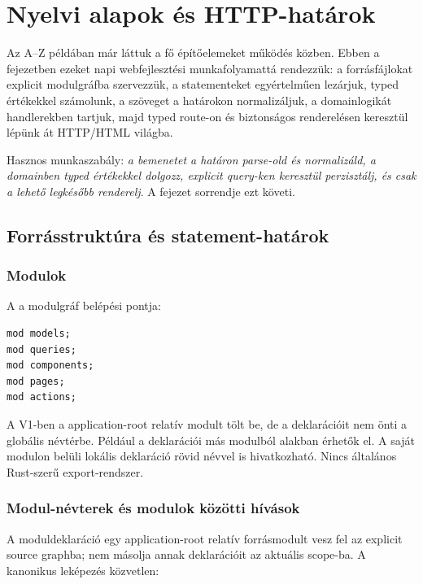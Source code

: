 \chapter{Nyelvi alapok és HTTP-határok}

Az A--Z példában már láttuk a fő építőelemeket működés közben. Ebben a fejezetben ezeket napi webfejlesztési munkafolyamattá rendezzük: a forrásfájlokat explicit modulgráfba szervezzük, a statementeket egyértelműen lezárjuk, typed értékekkel számolunk, a szöveget a határokon normalizáljuk, a domainlogikát handlerekben tartjuk, majd typed route-on és biztonságos renderelésen keresztül lépünk át HTTP/HTML világba.

Hasznos munkaszabály: \emph{a bemenetet a határon parse-old és normalizáld, a domainben typed értékekkel dolgozz, explicit query-ken keresztül perzisztálj, és csak a lehető legkésőbb renderelj}. A fejezet sorrendje ezt követi.

\section{Forrásstruktúra és statement-határok}

\subsection*{Modulok}

A  a modulgráf belépési pontja:

\begin{lstlisting}[language=RWLang]
mod models;
mod queries;
mod components;
mod pages;
mod actions;
\end{lstlisting}

A V1-ben a  application-root relatív modult tölt be, de a deklarációit nem önti a globális névtérbe. Például a  deklarációi más modulból  alakban érhetők el. A saját modulon belüli lokális deklaráció rövid névvel is hivatkozható. Nincs általános Rust-szerű  export-rendszer.

\subsection*{Modul-névterek és modulok közötti hívások}

A moduldeklaráció egy application-root relatív forrásmodult vesz fel az explicit source graphba; nem másolja annak deklarációit az aktuális scope-ba. A kanonikus leképezés közvetlen:

